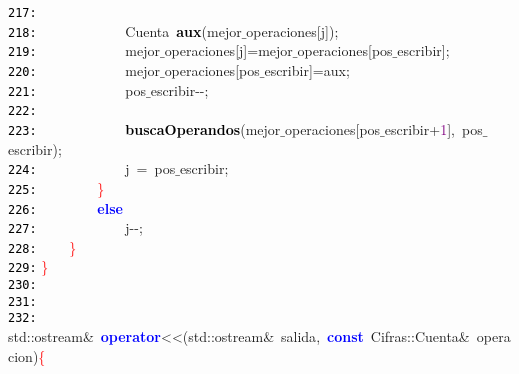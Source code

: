 \documentclass[a4paper,10pt]{scrartcl}
\begin{document}
{   \mbox{}\texttt{\textcolor{Black}{217:}}  \\
   \mbox{}\texttt{\textcolor{Black}{218:}} \ \ \ \ \ \ \ \ \ \ \ \ \textcolor{TealBlue}{Cuenta}\ \textbf{\textcolor{Black}{aux}}\textcolor{BrickRed}{(}mejor$\_$operaciones\textcolor{BrickRed}{[}j\textcolor{BrickRed}{]);} \\
   \mbox{}\texttt{\textcolor{Black}{219:}} \ \ \ \ \ \ \ \ \ \ \ \ mejor$\_$operaciones\textcolor{BrickRed}{[}j\textcolor{BrickRed}{]=}mejor$\_$operaciones\textcolor{BrickRed}{[}pos$\_$escribir\textcolor{BrickRed}{];} \\
   \mbox{}\texttt{\textcolor{Black}{220:}} \ \ \ \ \ \ \ \ \ \ \ \ mejor$\_$operaciones\textcolor{BrickRed}{[}pos$\_$escribir\textcolor{BrickRed}{]=}aux\textcolor{BrickRed}{;} \\
   \mbox{}\texttt{\textcolor{Black}{221:}} \ \ \ \ \ \ \ \ \ \ \ \ pos$\_$escribir\textcolor{BrickRed}{-\/-;} \\
   \mbox{}\texttt{\textcolor{Black}{222:}} \ \ \ \ \ \  \\
   \mbox{}\texttt{\textcolor{Black}{223:}} \ \ \ \ \ \ \ \ \ \ \ \ \textbf{\textcolor{Black}{buscaOperandos}}\textcolor{BrickRed}{(}mejor$\_$operaciones\textcolor{BrickRed}{[}pos$\_$escribir\textcolor{BrickRed}{+}\textcolor{Purple}{1}\textcolor{BrickRed}{],}\ pos$\_$escribir\textcolor{BrickRed}{);} \\
   \mbox{}\texttt{\textcolor{Black}{224:}} \ \ \ \ \ \ \ \ \ \ \ \ j\ \textcolor{BrickRed}{=}\ pos$\_$escribir\textcolor{BrickRed}{;} \\
   \mbox{}\texttt{\textcolor{Black}{225:}} \ \ \ \ \ \ \ \ \textcolor{Red}{\}} \\
   \mbox{}\texttt{\textcolor{Black}{226:}} \ \ \ \ \ \ \ \ \textbf{\textcolor{Blue}{else}} \\
   \mbox{}\texttt{\textcolor{Black}{227:}} \ \ \ \ \ \ \ \ \ \ \ \ j\textcolor{BrickRed}{-\/-;} \\
   \mbox{}\texttt{\textcolor{Black}{228:}} \ \ \ \ \textcolor{Red}{\}} \\
   \mbox{}\texttt{\textcolor{Black}{229:}} \textcolor{Red}{\}} \\
   \mbox{}\texttt{\textcolor{Black}{230:}}  \\
   \mbox{}\texttt{\textcolor{Black}{231:}}  \\
   \mbox{}\texttt{\textcolor{Black}{232:}} std\textcolor{BrickRed}{::}ostream\textcolor{BrickRed}{\&}\ \textbf{\textcolor{Blue}{operator}}\textcolor{BrickRed}{\textless{}\textless{}(}std\textcolor{BrickRed}{::}ostream\textcolor{BrickRed}{\&}\ salida\textcolor{BrickRed}{,}\ \textbf{\textcolor{Blue}{const}}\ Cifras\textcolor{BrickRed}{::}Cuenta\textcolor{BrickRed}{\&}\ operacion\textcolor{BrickRed}{)}\textcolor{Red}{\{} \\
}
\end{document}
